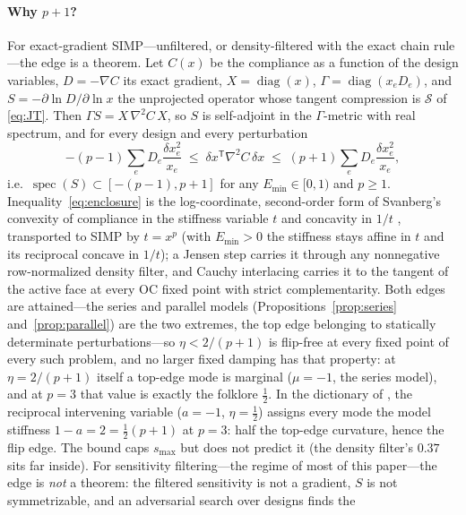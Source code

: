\documentclass[11pt,a4paper]{article}
\newcommand{\smax}{s_{\max}}
\begin{document}
\paragraph{Why $p+1$?} For exact-gradient SIMP---unfiltered, or
density-filtered with the exact chain rule---the edge is a theorem.
Let $C(x)$ be the compliance as a function of the design variables,
$D=-\nabla C$ its exact gradient, $X=\operatorname{diag}(x)$,
$\Gamma=\operatorname{diag}(x_eD_e)$, and $S=-\partial\ln D/\partial\ln x$
the unprojected operator whose tangent compression is $\mathcal S$ of
\eqref{eq:JT}. Then $\Gamma S=X\,\nabla^2C\,X$, so $S$ is self-adjoint
in the $\Gamma$-metric with real spectrum, and for every design and
every perturbation
\begin{equation}
-(p-1)\sum_e D_e\frac{\delta x_e^2}{x_e}\;\le\;
\delta x^{\mathsf T}\nabla^2C\,\delta x\;\le\;
(p+1)\sum_e D_e\frac{\delta x_e^2}{x_e},
\label{eq:enclosure}
\end{equation}
i.e.\ $\operatorname{spec}(S)\subset[-(p{-}1),p{+}1]$ for any
$E_{\min}\in[0,1)$ and $p\ge1$. Inequality~\eqref{eq:enclosure} is the
log-coordinate, second-order form of Svanberg's convexity of compliance
in the stiffness variable $t$ and concavity in $1/t$
\citep{svanberg1994convexity}, transported to SIMP by $t=x^p$ (with
$E_{\min}>0$ the stiffness stays affine in $t$ and its reciprocal
concave in $1/t$); a Jensen step carries it through any nonnegative
row-normalized density filter, and Cauchy interlacing carries it to the
tangent of the active face at every OC fixed point with strict
complementarity. Both edges are attained---the series and parallel
models (Propositions~\ref{prop:series} and~\ref{prop:parallel}) are the
two extremes, the top edge belonging to statically determinate
perturbations---so $\eta<2/(p{+}1)$ is flip-free at every fixed point
of every such problem, and no larger fixed damping has that property:
at $\eta=2/(p{+}1)$ itself a top-edge mode is marginal ($\mu=-1$, the
series model), and at $p=3$ that value is exactly the folklore
$\tfrac12$. In the
dictionary of \citet{groenwold2008}, the reciprocal intervening
variable ($a=-1$, $\eta=\tfrac12$) assigns every mode the model
stiffness $1-a=2=\tfrac12(p{+}1)$ at $p=3$: half the top-edge curvature,
hence the flip edge. The bound caps $\smax$ but does not predict it
(the density filter's $0.37$ sits far inside). For sensitivity
filtering---the regime of most of this paper---the edge is \emph{not} a
theorem: the filtered sensitivity is not a gradient, $S$ is not
symmetrizable, and an adversarial search over designs finds the
\end{document}
